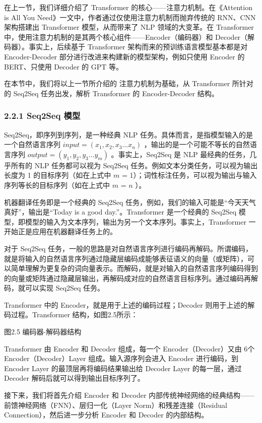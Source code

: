\documentclass[12pt,a4paper]{book}
\begin{document}
在上一节，我们详细介绍了 Transformer
的核心------注意力机制。在《Attention is All You
Need》一文中，作者通过仅使用注意力机制而抛弃传统的 RNN、CNN 架构搭建出
Transformer 模型，从而带来了 NLP 领域的大变革。在 Transformer
中，使用注意力机制的是其两个核心组件------Encoder（编码器）和
Decoder（解码器）。事实上，后续基于 Transformer
架构而来的预训练语言模型基本都是对 Encoder-Decoder
部分进行改进来构建新的模型架构，例如只使用 Encoder 的 BERT、只使用
Decoder 的 GPT 等。

在本节中，我们将以上一节所介绍的 注意力机制为基础，从 Transformer
所针对的 Seq2Seq 任务出发，解析 Transformer 的 Encoder-Decoder 结构。

\subsubsection{2.2.1 Seq2Seq 模型}\label{seq2seq-ux6a21ux578b}

Seq2Seq，即序列到序列，是一种经典 NLP
任务。具体而言，是指模型输入的是一个自然语言序列
\(input = (x_1, x_2, x_3...x_n)\) ，输出的是一个可能不等长的自然语言序列
\(output = (y_1, y_2, y_3...y_m)\) 。事实上，Seq2Seq 是 NLP
最经典的任务，几乎所有的 NLP 任务都可以视为 Seq2Seq
任务。例如文本分类任务，可以视为输出长度为 1 的目标序列（如在上式中
\(m\) =
1）；词性标注任务，可以视为输出与输入序列等长的目标序列（如在上式中
\(m\) = \(n\) ）。

机器翻译任务即是一个经典的 Seq2Seq
任务，例如，我们的输入可能是``今天天气真好''，输出是``Today is a good
day.''。Transformer 是一个经典的 Seq2Seq
模型，即模型的输入为文本序列，输出为另一个文本序列。事实上，Transformer
一开始正是应用在机器翻译任务上的。

对于 Seq2Seq
任务，一般的思路是对自然语言序列进行编码再解码。所谓编码，就是将输入的自然语言序列通过隐藏层编码成能够表征语义的向量（或矩阵），可以简单理解为更复杂的词向量表示。而解码，就是对输入的自然语言序列编码得到的向量或矩阵通过隐藏层输出，再解码成对应的自然语言目标序列。通过编码再解码，就可以实现
Seq2Seq 任务。

Transformer 中的 Encoder，就是用于上述的编码过程；Decoder
则用于上述的解码过程。Transformer 结构，如图2.5所示：

图2.5 编码器-解码器结构

Transformer 由 Encoder 和 Decoder 组成，每一个 Encoder（Decoder）又由
6个 Encoder（Decoder）Layer 组成。输入源序列会进入 Encoder 进行编码，到
Encoder Layer 的最顶层再将编码结果输出给 Decoder Layer 的每一层，通过
Decoder 解码后就可以得到输出目标序列了。

接下来，我们将首先介绍 Encoder 和 Decoder
内部传统神经网络的经典结构------前馈神经网络（FNN）、层归一化（Layer
Norm）和残差连接（Residual Connection），然后进一步分析 Encoder 和
Decoder 的内部结构。
\end{document}
